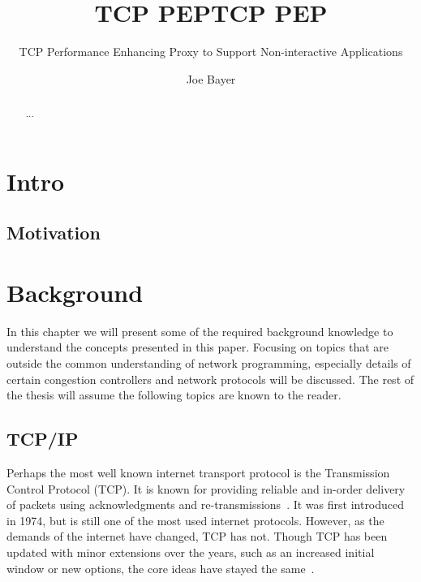 \documentclass[a4paper,english, 11pt]{report}
\author{Joe Bayer}
\title{TCP PEP}
\subtitle{TCP Performance Enhancing Proxy to Support Non-interactive Applications}
\title{TCP PEP}
\begin{document}
 \uiomasterfp[program={Informatics: Programming and System Architecture}, supervisors={Michael Welzl\and Kristjon Ciko}]
\tableofcontents


\listoffigures
{}

\begin{abstract}
   ...
\end{abstract}

\chapter{Intro}

\section{Motivation}

\chapter{Background}

In this chapter we will present some of the required background knowledge to understand the concepts presented in this paper. Focusing on topics that are outside the common understanding of network programming, especially details of certain congestion controllers and network protocols will be discussed. The rest of the thesis will assume the following topics are known to the reader. 

\section{TCP/IP}
Perhaps the most well known internet transport protocol is the Transmission Control Protocol (TCP). It is known for providing reliable and in-order delivery of packets using acknowledgments and re-transmissions~\cite{Eddy_2022}. It was first introduced in 1974, but is still one of the most used internet protocols. However, as the demands of the internet have changed, TCP has not. Though TCP has been updated with minor extensions over the years, such as an increased initial window or new options, the core ideas have stayed the same~\cite{rfc8803}.\\
\end{document}

